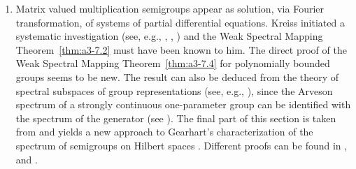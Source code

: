 \begin{enumerate}[label=\emph{Section \arabic*:}, wide]
\item 
Matrix valued multiplication semigroups appear as solution, via Fourier transformation, of systems of partial differential equations.
Kreiss initiated a systematic investigation (see, e.g., \citet{kreiss:1958}, \citet{kreiss:1959}, \citet{millerstrang:1966}) and the Weak Spectral Mapping Theorem~\ref{thm:a3-7.2} must have been known to him. The direct proof of the Weak Spectral Mapping Theorem~\ref{thm:a3-7.4} for polynomially bounded groups seems to be new. The result can also be deduced from the theory of spectral subspaces of group representations (see, e.g., \citet{combesdelaroche:1978}), since the Arveson spectrum of a strongly continuous one-parameter group can be identified with the spectrum of the generator (see \citet{evans:1976}). The final part of this section is taken from \citet{greiner:1985} and yields a new approach to Gearhart's characterization of the spectrum of semigroups on Hilbert spaces \citet{gearhart:1978}. Different proofs can be found in \citet{herbst:1983}, \citet{howland:1984} and \citet{pruess:1984}. 
\end{enumerate}



